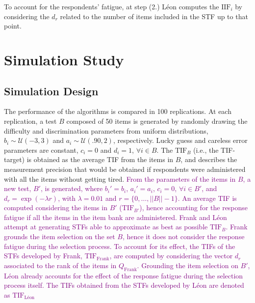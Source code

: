 \documentclass{svproc}
\newcommand{\ottavia}[1]{\textcolor{purple}{#1}}
\begin{document}
To account for the respondents' fatigue, at step (2.) Léon computes the $\text{IIF}_i$ by considering the $d_r$ related to the number of items included in the STF up to that point.  
\normalcolor


\section{Simulation Study}

\subsection{Simulation Design}



 The performance of the algorithms is compared in 100 replications. At each replication, a test $B$ composed of 50 items is generated by randomly drawing the difficulty and discrimination parameters from uniform distributions, $b_i \sim \mathcal{U}(-3, 3)$ and $a_i \sim \mathcal{U}(.90, 2)$, respectively. Lucky 
guess and careless error parameters are constant, $c_i = 0$ and $d_i = 1$, $\forall i \in B$.
The $\text{TIF}_B$ (i.e., the TIF-target) is obtained as the average TIF  from the items in $B$, and describes the measurement precision that would be obtained if respondents were administered with all the items without getting tired. 
{\ottavia{
From the parameters of the items in $B$, a new test, $B'$, is generated, where $b_i' = b_i$, $a_i' = a_i$, $c_i = 0$, $\forall i \in B'$, and $d_r = \exp(-\lambda r)$, with $\lambda = 0.01$ and $r = \{0, \ldots, ||B|| -1\}$.
An average TIF is computed considering the items in $B'$ ($\text{TIF}_{B'}$), hence accounting for the response fatigue if all the items in the item bank are administered.  
Frank and Léon attempt at generating STFs able to approximate as best as possible $\text{TIF}_B$. 
Frank grounds the item selection on the set $B$, hence it does not consider the response fatigue during the selection process. To account for its effect, the TIFs of the STFs developed by Frank, $\text{TIF}_{\text{Frank}}$, are computed by considering the vector $d_r$ associated to the rank of the items in $Q_{\text{Frank}}$.
Grounding the item selection on $B'$, Léon already accounts for the effect of the response fatigue during the selection process itself. The TIFs obtained from the STFs developed by Léon are denoted as $\text{TIF}_{\text{Léon}}$
}}
\normalcolor
\end{document}
